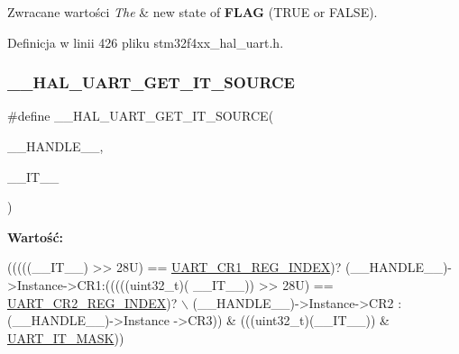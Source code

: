 \begin{DoxyRetVals}{Zwracane wartości}
{\em The} & new state of {\bfseries F\+L\+AG} (T\+R\+UE or F\+A\+L\+SE). \\
\hline
\end{DoxyRetVals}


Definicja w linii 426 pliku stm32f4xx\+\_\+hal\+\_\+uart.\+h.

\mbox{\label{group___u_a_r_t___exported___macros_gab7ad503802bf56bf397c392fc8e18b77}} 
\subsubsection{\texorpdfstring{\+\_\+\+\_\+\+H\+A\+L\+\_\+\+U\+A\+R\+T\+\_\+\+G\+E\+T\+\_\+\+I\+T\+\_\+\+S\+O\+U\+R\+CE}{\_\_HAL\_UART\_GET\_IT\_SOURCE}}
{\footnotesize\ttfamily \#define \+\_\+\+\_\+\+H\+A\+L\+\_\+\+U\+A\+R\+T\+\_\+\+G\+E\+T\+\_\+\+I\+T\+\_\+\+S\+O\+U\+R\+CE(\begin{DoxyParamCaption}\item[{}]{\+\_\+\+\_\+\+H\+A\+N\+D\+L\+E\+\_\+\+\_\+,  }\item[{}]{\+\_\+\+\_\+\+I\+T\+\_\+\+\_\+ }\end{DoxyParamCaption})}

{\bfseries Wartość\+:}
\begin{DoxyCode}
(((((\_\_IT\_\_) >> 28U) == \hyperlink{group___u_a_r_t___private___constants_ga5917bcb19b2dab202b8cbfa82520b93e}{UART\_CR1\_REG\_INDEX})? (\_\_HANDLE\_\_)->Instance->CR1:(((((uint32\_t)(
      \_\_IT\_\_)) >> 28U) == \hyperlink{group___u_a_r_t___private___constants_ga3a8b0ee44c75493eb001e60a9876e586}{UART\_CR2\_REG\_INDEX})? \(\backslash\)
                                                      (\_\_HANDLE\_\_)->Instance->CR2 : (\_\_HANDLE\_\_)->Instance
      ->CR3)) & (((uint32\_t)(\_\_IT\_\_)) & \hyperlink{group___u_a_r_t___private___constants_ga869439269c26e8dee93d49b1c7e67448}{UART\_IT\_MASK}))
\end{DoxyCode}



